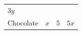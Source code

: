 {\begin{mdframed}[linewidth=4, leftmargin=40, rightmargin=40]
\begin{exercise}
\begin{enumerate}[noitemsep, label=\textbf{Step} \textbf{\arabic*}. ]
{\begin{tabular}[t]{|l|l|l|l|}
    
        
                  \begin{math}3y\end{math}
     \tabularnewline\cline{1-1}\cline{2-2}\cline{3-3}\cline{4-4}
    
    
        Chocolate &
    
    
        
                  \begin{math}x\end{math}
                 &
    
    
        5 &
    
    
        
                  \begin{math}5x\end{math}
     \tabularnewline\cline{1-1}\cline{2-2}\cline{3-3}\cline{4-4}
    \end{tabular}} %
\end{enumerate}
\end{exercise}
\end{mdframed}}
